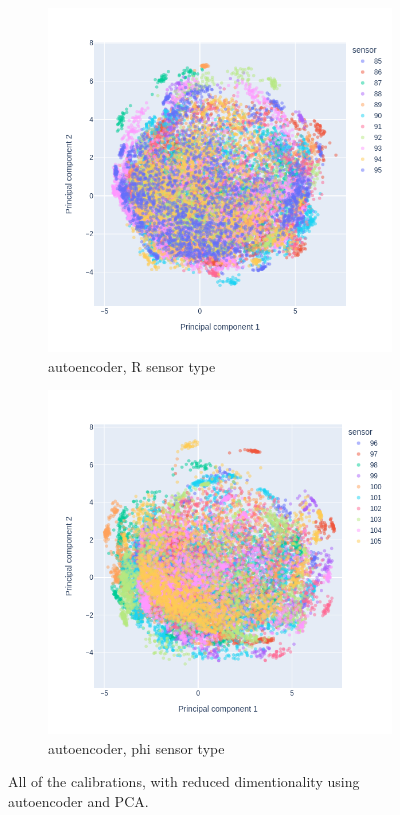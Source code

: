 \begin{figure}
\begin{subfigure}[b]{0.45\textwidth}
    \centering
    \includegraphics[width=\linewidth]{figures/chapter4/dimred/PCA_pedestals_phi_2.png}
\caption{autoencoder, R sensor type}
    \label{plot:PCA_pedestals_2_phi}
  \end{subfigure}
\begin{subfigure}[b]{0.45\textwidth}
    \centering
    \includegraphics[width=\linewidth]{figures/chapter4/dimred/PCA_pedestals_phi_3.png}
\caption{autoencoder, phi sensor type}
   \label{plot:PCA_pedestals_3_phi}
  \end{subfigure}

    \caption[All calibrationd]{All of the calibrations, with reduced dimentionality using autoencoder and PCA.}
    \label{plot:pca_all_ped_phi}
\end{figure}



